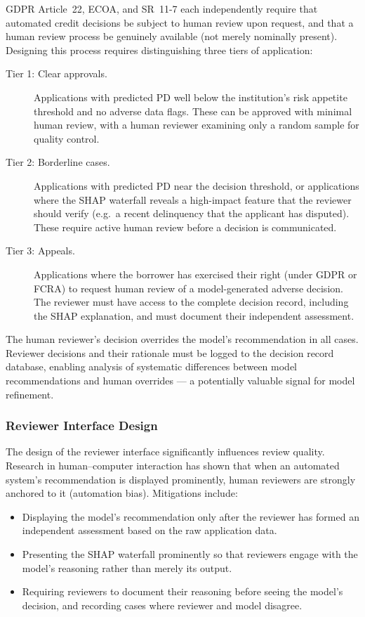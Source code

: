 \begin{context}
GDPR Article~22, ECOA, and SR~11-7 each independently require that automated credit decisions be subject to human review upon request, and that a human review process be genuinely available (not merely nominally present). Designing this process requires distinguishing three tiers of application:

\begin{description}
  \item[Tier 1: Clear approvals.] Applications with predicted PD well below the institution's risk appetite threshold and no adverse data flags. These can be approved with minimal human review, with a human reviewer examining only a random sample for quality control.
  \item[Tier 2: Borderline cases.] Applications with predicted PD near the decision threshold, or applications where the SHAP waterfall reveals a high-impact feature that the reviewer should verify (e.g.\ a recent delinquency that the applicant has disputed). These require active human review before a decision is communicated.
  \item[Tier 3: Appeals.] Applications where the borrower has exercised their right (under GDPR or FCRA) to request human review of a model-generated adverse decision. The reviewer must have access to the complete decision record, including the SHAP explanation, and must document their independent assessment.
\end{description}

The human reviewer's decision overrides the model's recommendation in all cases. Reviewer decisions and their rationale must be logged to the decision record database, enabling analysis of systematic differences between model recommendations and human overrides --- a potentially valuable signal for model refinement.

\subsubsection*{Reviewer Interface Design}

The design of the reviewer interface significantly influences review quality. Research in human--computer interaction has shown that when an automated system's recommendation is displayed prominently, human reviewers are strongly anchored to it (automation bias). Mitigations include:

\begin{itemize}
  \item Displaying the model's recommendation only after the reviewer has formed an independent assessment based on the raw application data.
  \item Presenting the SHAP waterfall prominently so that reviewers engage with the model's reasoning rather than merely its output.
  \item Requiring reviewers to document their reasoning before seeing the model's decision, and recording cases where reviewer and model disagree.
\end{itemize}


\end{context}
